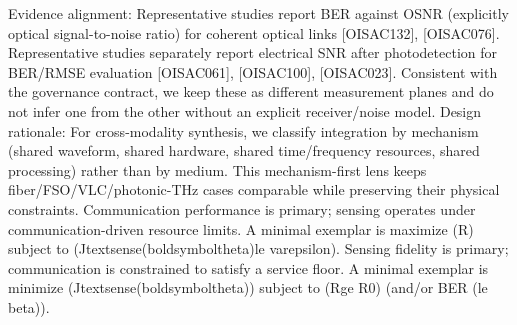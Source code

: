 {}Evidence alignment: Representative studies report BER against OSNR (explicitly optical signal-to-noise ratio) for coherent optical links [O\markdownRendererUnderscore{}ISAC\markdownRendererUnderscore{}132], [O\markdownRendererUnderscore{}ISAC\markdownRendererUnderscore{}076].\markdownRendererSoftLineBreak
{}Representative studies separately report electrical SNR after photodetection for BER/RMSE evaluation [O\markdownRendererUnderscore{}ISAC\markdownRendererUnderscore{}061], [O\markdownRendererUnderscore{}ISAC\markdownRendererUnderscore{}100], [O\markdownRendererUnderscore{}ISAC\markdownRendererUnderscore{}023]. Consistent with the governance contract, we keep these as different measurement planes and do not infer one from the other without an explicit receiver/noise model.\markdownRendererInterblockSeparator
{}
\markdownRendererSectionEnd \markdownRendererSectionBegin
{}\markdownRendererInterblockSeparator
{}Design rationale: For cross-modality synthesis, we classify integration by mechanism (shared waveform, shared hardware, shared time/frequency resources, shared processing) rather than by medium. This mechanism-first lens keeps fiber/FSO/VLC/photonic-THz cases comparable while preserving their physical constraints.\markdownRendererParagraphSeparator
{} Communication performance is primary; sensing operates under communication-driven resource limits. A minimal exemplar is maximize (R) subject to (J\markdownRendererUnderscore{}\markdownRendererLeftBrace{}\markdownRendererBackslash{}text\markdownRendererLeftBrace{}sense\markdownRendererRightBrace{}\markdownRendererRightBrace{}(\markdownRendererBackslash{}boldsymbol\markdownRendererLeftBrace{}\markdownRendererBackslash{}theta\markdownRendererRightBrace{})\markdownRendererBackslash{}le \markdownRendererBackslash{}varepsilon).\markdownRendererParagraphSeparator
{} Sensing fidelity is primary; communication is constrained to satisfy a service floor. A minimal exemplar is minimize (J\markdownRendererUnderscore{}\markdownRendererLeftBrace{}\markdownRendererBackslash{}text\markdownRendererLeftBrace{}sense\markdownRendererRightBrace{}\markdownRendererRightBrace{}(\markdownRendererBackslash{}boldsymbol\markdownRendererLeftBrace{}\markdownRendererBackslash{}theta\markdownRendererRightBrace{})) subject to (R\markdownRendererBackslash{}ge R\markdownRendererUnderscore{}0) (and/or BER (\markdownRendererBackslash{}le \markdownRendererBackslash{}beta)).\markdownRendererParagraphSeparator
